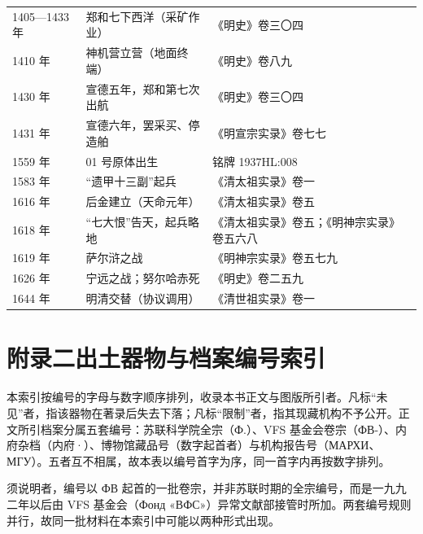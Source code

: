 {\begin{longtable}{@{}p{31mm}p{55mm}p{45mm}@{}}
1405—1433 年 & 郑和七下西洋（采矿作业） & 《明史》卷三〇四\\
1410 年 & 神机营立营（地面终端） & 《明史》卷八九\\
1430 年 & 宣德五年，郑和第七次出航 & 《明史》卷三〇四\\
1431 年 & 宣德六年，罢采买、停造舶 & 《明宣宗实录》卷七七\\
1559 年 & 01 号原体出生 & 铭牌 1937HL:008\\
1583 年 & “遗甲十三副”起兵 & 《清太祖实录》卷一\\
1616 年 & 后金建立（天命元年） & 《清太祖实录》卷五\\
1618 年 & “七大恨”告天，起兵略地 & 《清太祖实录》卷五；《明神宗实录》卷五六八\\
1619 年 & 萨尔浒之战 & 《明神宗实录》卷五七九\\
1626 年 & 宁远之战；努尔哈赤死 & 《明史》卷二五九\\
1644 年 & 明清交替（协议调用） & 《清世祖实录》卷一\\
\end{longtable}
}

\clearpage
\chapter*{附录二\quad 出土器物与档案编号索引}

\noindent
本索引按编号的字母与数字顺序排列，收录本书正文与图版所引者。凡标“未见”者，指该器物在著录后失去下落；凡标“限制”者，指其现藏机构不予公开。正文所引档案分属五套编号：苏联科学院全宗（Ф.）、VFS 基金会卷宗（ФВ-）、内府杂档（内府·）、博物馆藏品号（数字起首者）与机构报告号（МАРХИ、МГУ）。五者互不相属，故本表以编号首字为序，同一首字内再按数字排列。

须说明者，编号以 ФВ 起首的一批卷宗，并非苏联时期的全宗编号，而是一九九二年以后由 VFS 基金会（Фонд «ВФС»）异常文献部接管时所加。两套编号规则并行，故同一批材料在本索引中可能以两种形式出现。

